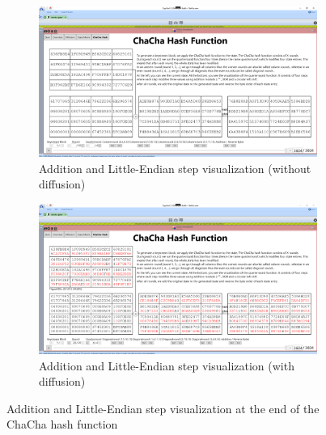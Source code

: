 \begin{figure}
\centering
\begin{subfigure}{\textwidth}
  \centering
  \includegraphics[width=\textwidth]{figures/ct2/chachahash/chachahash-end.png}
  \caption{Addition and Little-Endian step visualization (without diffusion)}
  \label{fig:chachahash.end.without.diffusion}
\end{subfigure}
\begin{subfigure}{\textwidth}
  \centering
  \includegraphics[width=\textwidth]{figures/ct2/chachahash/chachahash-end-diffusion.png}
  \caption{Addition and Little-Endian step visualization (with diffusion)}
  \label{fig:chachahash.end.with.diffusion}
\end{subfigure}
\caption[Addition and Little-Endian step visualization]{Addition and Little-Endian step visualization at the end of the ChaCha hash function}
\label{fig:chachahash.end}
\end{figure}

